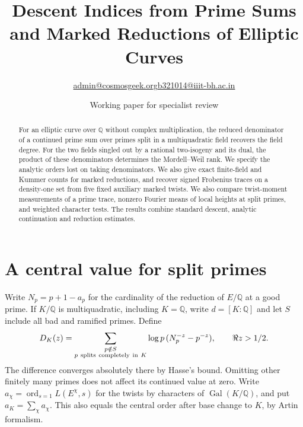 \documentclass[11pt]{article}
\title{Descent Indices from Prime Sums and Marked Reductions of Elliptic Curves}
\author{\small \href{mailto:admin@cosmosgeek.org}{admin@cosmosgeek.org}\qquad \href{mailto:b321014@iiit-bh.ac.in}{b321014@iiit-bh.ac.in}}
\date{Working paper for specialist review}
\newcommand{\Q}{\mathbb Q}\newcommand{\Z}{\mathbb Z}\newcommand{\F}{\mathbb F}
\newcommand{\ord}{\operatorname{ord}}\newcommand{\Sur}{\operatorname{Sur}}
\begin{document}
\maketitle
\begin{abstract}
For an elliptic curve over $\Q$ without complex multiplication, the reduced denominator of a continued prime sum over primes split in a multiquadratic field recovers the field degree. For the two fields singled out by a rational two-isogeny and its dual, the product of these denominators determines the Mordell--Weil rank. We specify the analytic orders lost on taking denominators. We also give exact finite-field and Kummer counts for marked reductions, and recover signed Frobenius traces on a density-one set from five fixed auxiliary marked twists. We also compare twist-moment measurements of a prime trace, nonzero Fourier means of local heights at split primes, and weighted character tests. The results combine standard descent, analytic continuation and reduction estimates.
\end{abstract}

\section{A central value for split primes}
Write $N_p=p+1-a_p$ for the cardinality of the reduction of $E/\Q$ at a good prime. If $K/\Q$ is multiquadratic, including $K=\Q$, write $d=[K:\Q]$ and let $S$ include all bad and ramified primes. Define
\[
 D_K(z)=\sum_{\substack{p\notin S\\p\ {\rm splits\ completely\ in}\ K}}
 \log p\,(N_p^{-z}-p^{-z}),\qquad \Re z>1/2.
\]
The difference converges absolutely there by Hasse's bound. Omitting other finitely many primes does not affect its continued value at zero. Write $a_\chi=\ord_{s=1}L(E^\chi,s)$ for the twists by characters of $\operatorname{Gal}(K/\Q)$, and put $a_K=\sum_\chi a_\chi$. This also equals the central order after base change to $K$, by Artin formalism.
\end{document}
